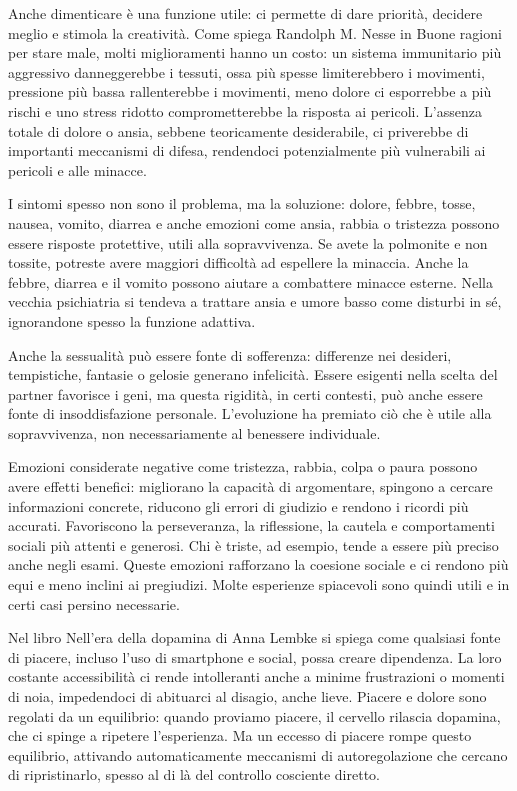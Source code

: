 \documentclass[12pt]{book} %
\begin{document}
\begin{mdframed}[linewidth=1pt]
Anche dimenticare è una funzione utile: ci permette di dare priorità, decidere meglio e stimola la creatività. Come spiega Randolph M. Nesse in Buone ragioni per stare male, molti miglioramenti hanno un costo: un sistema immunitario più aggressivo danneggerebbe i tessuti, ossa più spesse limiterebbero i movimenti, pressione più bassa rallenterebbe i movimenti, meno dolore ci esporrebbe a più rischi e uno stress ridotto comprometterebbe la risposta ai pericoli. L'assenza totale di dolore o ansia, sebbene teoricamente desiderabile, ci priverebbe di importanti meccanismi di difesa, rendendoci potenzialmente più vulnerabili ai pericoli e alle minacce.

I sintomi spesso non sono il problema, ma la soluzione: dolore, febbre, tosse, nausea, vomito, diarrea e anche emozioni come ansia, rabbia o tristezza possono essere risposte protettive, utili alla sopravvivenza. Se avete la polmonite e non tossite, potreste avere maggiori difficoltà ad espellere la minaccia. Anche la febbre, diarrea e il vomito possono aiutare a combattere minacce esterne. Nella vecchia psichiatria si tendeva a trattare ansia e umore basso come disturbi in sé, ignorandone spesso la funzione adattiva.

Anche la sessualità può essere fonte di sofferenza: differenze nei desideri, tempistiche, fantasie o gelosie generano infelicità. Essere esigenti nella scelta del partner favorisce i geni, ma questa rigidità, in certi contesti, può anche essere fonte di insoddisfazione personale. L’evoluzione ha premiato ciò che è utile alla sopravvivenza, non necessariamente al benessere individuale.

Emozioni considerate negative come tristezza, rabbia, colpa o paura possono avere effetti benefici: migliorano la capacità di argomentare, spingono a cercare informazioni concrete, riducono gli errori di giudizio e rendono i ricordi più accurati. Favoriscono la perseveranza, la riflessione, la cautela e comportamenti sociali più attenti e generosi. Chi è triste, ad esempio, tende a essere più preciso anche negli esami. Queste emozioni rafforzano la coesione sociale e ci rendono più equi e meno inclini ai pregiudizi. Molte esperienze spiacevoli sono quindi utili e in certi casi persino necessarie.

Nel libro Nell'era della dopamina di Anna Lembke si spiega come qualsiasi fonte di piacere, incluso l’uso di smartphone e social, possa creare dipendenza. La loro costante accessibilità ci rende intolleranti anche a minime frustrazioni o momenti di noia, impedendoci di abituarci al disagio, anche lieve. Piacere e dolore sono regolati da un equilibrio: quando proviamo piacere, il cervello rilascia dopamina, che ci spinge a ripetere l’esperienza. Ma un eccesso di piacere rompe questo equilibrio, attivando automaticamente meccanismi di autoregolazione che cercano di ripristinarlo, spesso al di là del controllo cosciente diretto.


\end{mdframed}
\end{document}
